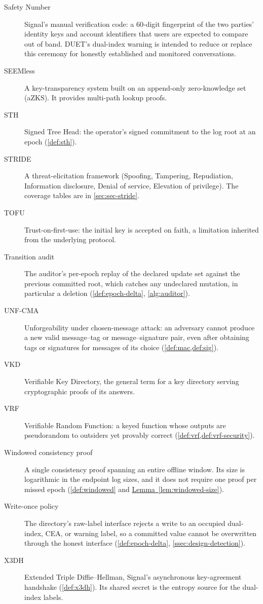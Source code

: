 \begin{description}
\item[Safety Number] Signal's manual verification code: a 60-digit fingerprint of the two parties'
  identity keys and account identifiers that users are expected to compare out of band. DUET's
  dual-index warning is intended to reduce or replace this ceremony for honestly established and
  monitored conversations.
\item[SEEMless] A key-transparency system built on an append-only zero-knowledge set (aZKS). It
  provides multi-path lookup proofs.
\item[STH] Signed Tree Head: the operator's signed commitment to the log root at an epoch
  (\cref{def:sth}).
\item[STRIDE] A threat-elicitation framework (Spoofing, Tampering, Repudiation, Information
  disclosure, Denial of service, Elevation of privilege). The coverage tables are in
  \cref{sec:sec-stride}.
\item[TOFU] Trust-on-first-use: the initial key is accepted on faith, a limitation inherited from the
  underlying protocol.
\item[Transition audit] The auditor's per-epoch replay of the declared update set against the
  previous committed root, which catches any undeclared mutation, in particular a deletion
  (\cref{def:epoch-delta}, \cref{alg:auditor}).
\item[UNF-CMA] Unforgeability under chosen-message attack: an adversary cannot produce a new valid
  message--tag or message--signature pair, even after obtaining tags or signatures for messages of
  its choice (\cref{def:mac,def:sig}).
\item[VKD] Verifiable Key Directory, the general term for a key directory serving cryptographic proofs
  of its answers.
\item[VRF] Verifiable Random Function: a keyed function whose outputs are pseudorandom to outsiders
  yet provably correct (\cref{def:vrf,def:vrf-security}).
\item[Windowed consistency proof] A single consistency proof spanning an entire offline window.
  Its size is logarithmic in the endpoint log sizes, and it does not require one proof per missed
  epoch (\cref{def:windowed} and \hyperref[lem:windowed-size]{Lemma~\ref*{lem:windowed-size}}).
\item[Write-once policy] The directory's raw-label interface rejects a write to an occupied
  dual-index, CEA, or warning label, so a committed value cannot be overwritten through the honest
  interface (\cref{def:epoch-delta}, \cref{ssec:design-detection}).
\item[X3DH] Extended Triple Diffie--Hellman, Signal's asynchronous key-agreement handshake
  (\cref{def:x3dh}). Its shared secret is the entropy source for the dual-index labels.
\end{description}
